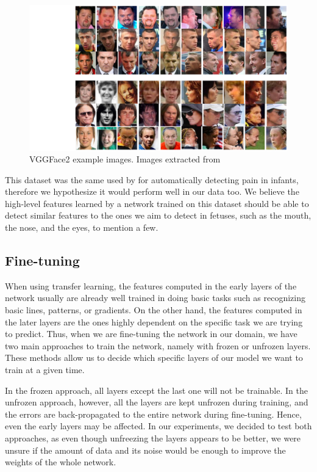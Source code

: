 \begin{figure}[h!tp]
    \centering
    \includegraphics[width=.8\textwidth]{imgs/chap5_vggface2.png}
    \caption[VGGFace2 example images.]{VGGFace2 example images. Images extracted from \cite{Cao2018}}
    \label{fig:vggface}
\end{figure}

This dataset was the same used by \cite{abs-1807-01631} for automatically detecting pain in infants, therefore we hypothesize it would perform well in our data too. We believe the high-level features learned by a network trained on this dataset should be able to detect similar features to the ones we aim to detect in fetuses, such as the mouth, the nose, and the eyes, to mention a few.

\subsection{Fine-tuning}

When using transfer learning, the features computed in the early layers of the network usually are already well trained in doing basic tasks such as recognizing basic lines, patterns, or gradients. On the other hand, the features computed in the later layers are the ones highly dependent on the specific task we are trying to predict. Thus, when we are fine-tuning the network in our domain, we have two main approaches to train the network, namely with frozen or unfrozen layers. These methods allow us to decide which specific layers of our model we want to train at a given time. 

In the frozen approach, all layers except the last one will not be trainable. In the unfrozen approach, however, all the layers are kept unfrozen during training, and the errors are back-propagated to the entire network during fine-tuning. Hence, even the early layers may be affected. In our experiments, we decided to test both approaches, as even though unfreezing the layers appears to be better, we were unsure if the amount of data and its noise would be enough to improve the weights of the whole network.




